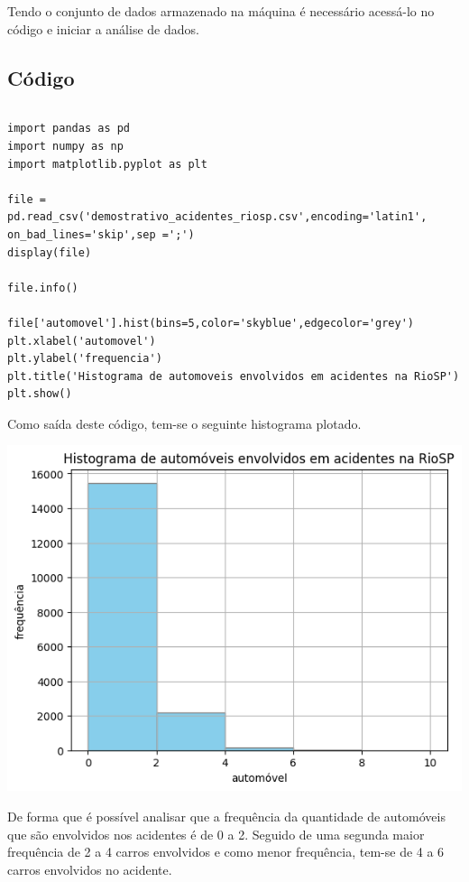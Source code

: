 \documentclass[a4paper, 12pt]{article}
\begin{document}
Tendo o conjunto de dados armazenado na máquina é necessário acessá-lo no código e iniciar a análise de dados.

\subsection{Código}

\begin{tabular}{ccc}
\end{tabular}

\begin{lstlisting} 
import pandas as pd 
import numpy as np
import matplotlib.pyplot as plt 

file = pd.read_csv('demostrativo_acidentes_riosp.csv',encoding='latin1', on_bad_lines='skip',sep =';')
display(file)

file.info()

file['automovel'].hist(bins=5,color='skyblue',edgecolor='grey')
plt.xlabel('automovel')
plt.ylabel('frequencia')
plt.title('Histograma de automoveis envolvidos em acidentes na RioSP')
plt.show()
\end{lstlisting}

Como saída deste código, tem-se o seguinte histograma plotado.

\includegraphics[scale=0.7]{output.png}

De forma que é possível analisar que a frequência da quantidade de automóveis que são envolvidos nos acidentes é de 0 a 2. Seguido de uma segunda maior frequência de 2 a 4 carros envolvidos e como menor frequência, tem-se de 4 a 6 carros envolvidos no acidente. 
\end{document}
